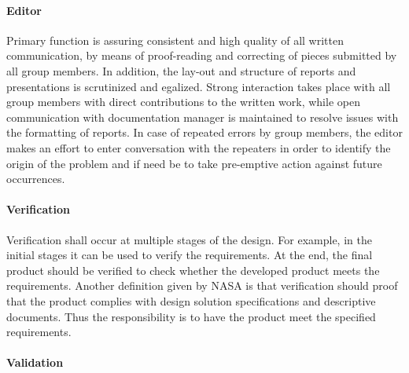 \paragraph{Editor}
Primary function is assuring consistent and high quality of all written communication, by means of proof-reading and correcting of pieces submitted by all group members. In addition, the lay-out and structure of reports and presentations is scrutinized and egalized. Strong interaction takes place with all group members with direct contributions to the written work, while open communication with documentation manager is maintained to resolve issues with the formatting of reports. In case of repeated errors by group members, the editor makes an effort to enter conversation with the repeaters in order to identify the origin of the problem and if need be to take pre-emptive action against future occurrences.
\paragraph{Verification}
Verification shall occur at multiple stages of the design. For example, in the initial stages it can be used to verify the requirements. At the end, the final product should be verified to check whether the developed product meets the requirements. Another definition given by NASA is that verification should proof that the product complies with design solution specifications and descriptive documents. Thus the responsibility is to have the product meet the specified requirements.

\paragraph{Validation}